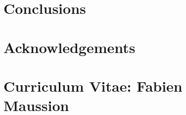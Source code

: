 \documentclass[twoside,10pt,openright]{scrbook} %
\begin{document}


\chapter{Conclusions}
\label{perspectives}



\chapter{Acknowledgements}



\chapter{Curriculum Vitae: Fabien Maussion}




%
%
%
%
%
%
%
%

%
%
%
%
%

\begin{footnotesize}
\cleardoublepage{}


\end{footnotesize}
\end{document}
